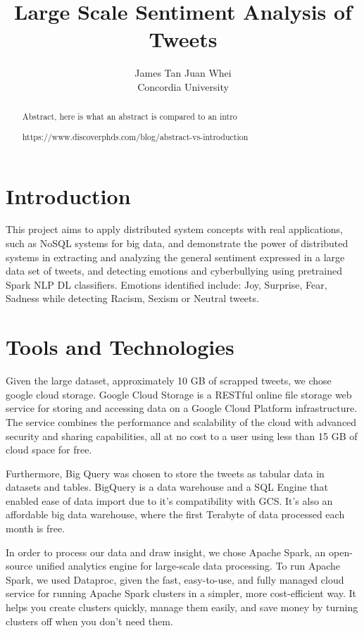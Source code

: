 \documentclass[a4paper,12pt]{article}
\begin{document}
\title{Large Scale Sentiment Analysis of Tweets }%
\author{
	James Tan Juan Whei\\
	Concordia University
}  
\maketitle

\begin{abstract}
Abstract, here is what an abstract is compared to an intro

https://www.discoverphds.com/blog/abstract-vs-introduction
\end{abstract}

\section{Introduction}

This project aims to apply distributed system concepts with real applications, such as NoSQL systems for big data,
and demonstrate the power of distributed systems in extracting and analyzing the general sentiment expressed in a large
data set of tweets, and detecting emotions and cyberbullying using pretrained Spark NLP DL classifiers.
Emotions identified include: Joy, Surprise, Fear, Sadness while detecting Racism, Sexism or Neutral tweets.


\section{Tools and Technologies}
Given the large dataset, approximately 10 GB of scrapped tweets, we chose google cloud storage.
Google Cloud Storage is a RESTful online file storage web service for storing and accessing data on a Google Cloud
Platform infrastructure. The service combines the performance and scalability of the cloud with advanced
security and sharing capabilities, all at no cost to a user using less than 15 GB of cloud space for free.

Furthermore, Big Query was chosen to store the tweets as tabular data in datasets and tables. BigQuery is a data warehouse
and a SQL Engine that enabled ease of data import due to it's compatibility with GCS. It's also an affordable big data
warehouse, where the first Terabyte of data processed each month is free.

In order to process our data and draw insight, we chose Apache Spark, an open-source unified analytics engine for
large-scale data processing. To run Apache Spark, we used Dataproc, given the fast, easy-to-use, and fully managed cloud
service for running Apache Spark clusters in a simpler, more cost-efficient way. It helps you create clusters quickly,
manage them easily, and save money by turning clusters off when you don't need them.
\end{document}
